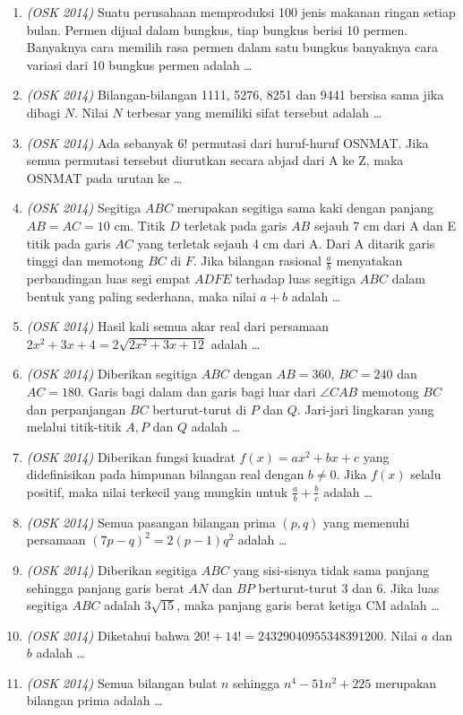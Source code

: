 \documentclass[11pt]{scrartcl}
\begin{document}
\begin{enumerate}
\item \textit{(OSK 2014)} Suatu perusahaan memproduksi 100 jenis makanan ringan setiap bulan. Permen dijual dalam bungkus, tiap bungkus berisi 10 permen. Banyaknya cara memilih rasa permen dalam satu bungkus banyaknya cara variasi dari 10 bungkus permen adalah \dots

\item \textit{(OSK 2014)} Bilangan-bilangan 1111, 5276, 8251 dan 9441 bersisa sama jika dibagi $N$. Nilai $N$ terbesar yang memiliki sifat tersebut adalah \dots

\item \textit{(OSK 2014)} Ada sebanyak $6!$ permutasi dari huruf-huruf OSNMAT. Jika semua permutasi tersebut diurutkan secara abjad dari A ke Z, maka OSNMAT pada urutan ke \dots

\item \textit{(OSK 2014)} Segitiga $ABC$ merupakan segitiga sama kaki dengan panjang $AB = AC = 10$ cm. Titik $D$ terletak pada garis $AB$ sejauh 7 cm dari A dan E titik pada garis $AC$ yang terletak sejauh 4 cm dari A. Dari A ditarik garis tinggi dan memotong $BC$ di $F$. Jika bilangan rasional $\frac{a}{b}$ menyatakan perbandingan luas segi empat $ADFE$ terhadap luas segitiga $ABC$ dalam bentuk yang paling sederhana, maka nilai $a+b$ adalah \dots

\item \textit{(OSK 2014)} Hasil kali semua akar real dari persamaan $2x^2 + 3x + 4 = 2\sqrt{2x^2 + 3x + 12}$ adalah \dots

\item \textit{(OSK 2014)} Diberikan segitiga $ABC$ dengan $AB = 360$, $BC = 240$ dan $AC = 180$. Garis bagi dalam dan garis bagi luar dari $\angle CAB$ memotong $BC$ dan perpanjangan $BC$ berturut-turut di $P$ dan $Q$. Jari-jari lingkaran yang melalui titik-titik $A, P$ dan $Q$ adalah \dots

\item \textit{(OSK 2014)} Diberikan fungsi kuadrat $f(x) = ax^2 + bx + c$ yang didefinisikan pada himpunan bilangan real dengan $b \ne 0$. Jika $f(x)$ selalu positif, maka nilai terkecil yang mungkin untuk $\frac{a}{b} + \frac{b}{c}$ adalah \dots

\item \textit{(OSK 2014)} Semua pasangan bilangan prima $(p,q)$ yang memenuhi persamaan $(7p - q)^2 = 2(p - 1)q^2$ adalah \dots

\item \textit{(OSK 2014)} Diberikan segitiga $ABC$ yang sisi-sisnya tidak sama panjang sehingga panjang garis berat $AN$ dan $BP$ berturut-turut 3 dan 6. Jika luas segitiga $ABC$ adalah $3\sqrt{15}$, maka panjang garis berat ketiga CM adalah \dots

\item \textit{(OSK 2014)} Diketahui bahwa $20! + 14! = 24329040955348391200$. Nilai $a$ dan $b$ adalah \dots

\item \textit{(OSK 2014)} Semua bilangan bulat $n$ sehingga $n^4 - 51n^2 + 225$ merupakan bilangan prima adalah \dots
\end{enumerate}
\newpage
\end{document}
